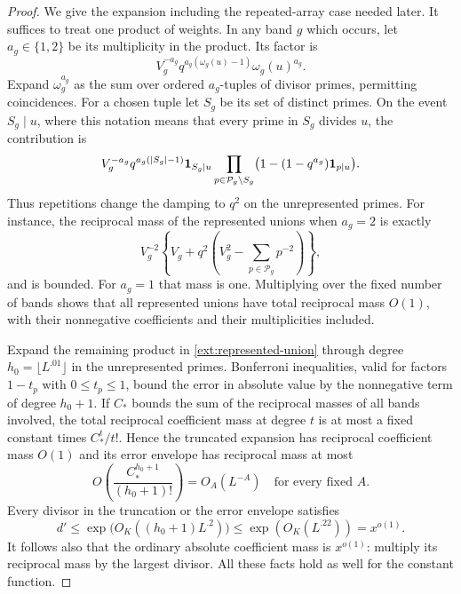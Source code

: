 \begin{proof}
We give the expansion including the repeated-array case needed
later.  It suffices to treat one product of weights.  In any band
$g$ which occurs, let $a_g\in\{1,2\}$ be its multiplicity in the
product.  Its factor is
\[
 V_g^{-a_g}q^{a_g(\omega_g(u)-1)}\omega_g(u)^{a_g}.
\]
Expand $\omega_g^{a_g}$ as the sum over ordered $a_g$-tuples of
divisor primes, permitting coincidences.  For a chosen tuple let
$S_g$ be its set of distinct primes.  On the event $S_g\mid u$,
where this notation means that every prime in $S_g$ divides $u$,
the contribution is
\begin{equation}\label{ext:represented-union}
 V_g^{-a_g}q^{a_g(|S_g|-1)}\mathbf{1}_{S_g\mid u}
 \prod_{p\in\mathcal P_g\setminus S_g}
        \bigl(1-(1-q^{a_g})\mathbf{1}_{p\mid u}\bigr).
\end{equation}
Thus repetitions change the damping to $q^2$ on the unrepresented
primes.  For instance, the reciprocal mass of the represented
unions when $a_g=2$ is exactly
\[
 V_g^{-2}\left\{V_g+q^2\left(V_g^2-
                                  \sum_{p\in\mathcal P_g}p^{-2}\right)\right\},
\]
and is bounded.  For $a_g=1$ that mass is one.
Multiplying over the fixed number of bands shows that all
represented unions have total reciprocal mass $O(1)$, with their
nonnegative coefficients and their multiplicities included.

Expand the remaining product in \eqref{ext:represented-union}
through degree $h_0=\lfloor L^{.01}\rfloor$ in the unrepresented
primes.  Bonferroni inequalities, valid for factors $1-t_p$ with
$0\leq t_p\leq1$, bound the error in absolute value by the
nonnegative term of degree $h_0+1$.  If $C_*$ bounds the sum of
the reciprocal masses of all bands involved, the total reciprocal
coefficient mass at degree $t$ is at most a fixed constant times
$C_*^t/t!$.  Hence the truncated expansion has reciprocal
coefficient mass $O(1)$ and its error envelope has reciprocal
mass at most
\begin{equation}\label{ext:bonferroni-tail}
 O\left(\frac{C_*^{h_0+1}}{(h_0+1)!}\right)=O_A(L^{-A})
 \quad\text{for every fixed }A.
\end{equation}
Every divisor in the truncation or the error envelope satisfies
\begin{equation}\label{ext:model-divisor-size}
 d'\leq\exp\bigl(O_K((h_0+1)L^{.2})\bigr)
       \leq\exp(O_K(L^{.22}))=x^{o(1)}.
\end{equation}
It follows also that the ordinary absolute coefficient mass is
$x^{o(1)}$: multiply its reciprocal mass by the largest divisor.
All these facts hold as well for the constant function.


\end{proof}
